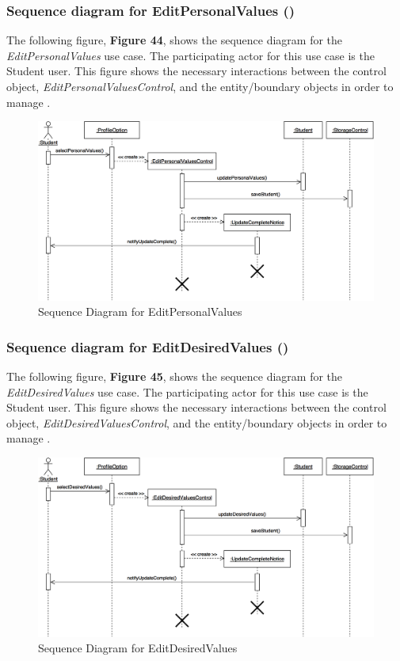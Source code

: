 \documentclass[12pt,letterpaper]{article}
\begin{document}
\subsubsection*{Sequence diagram for EditPersonalValues (\editpersonalvalues{})}

The following figure, {\bf Figure 44}, shows the sequence diagram for the {\it EditPersonalValues} use case. The participating actor for this use case is
the Student user. This figure shows the necessary interactions between the control object, {\it EditPersonalValuesControl}, and the
entity/boundary objects in order to manage \editpersonalvalues{}.

\begin{figure}[H]
	\centering{}
	\includegraphics[scale=0.3]{imgs/seq/edit-personal-values.png}
	\caption{Sequence Diagram for EditPersonalValues}
\end{figure}

\subsubsection*{Sequence diagram for EditDesiredValues (\editdesiredvalues{})}

The following figure, {\bf Figure 45}, shows the sequence diagram for the {\it EditDesiredValues} use case. The participating actor for this use case is
the Student user. This figure shows the necessary interactions between the control object, {\it EditDesiredValuesControl}, and the
entity/boundary objects in order to manage \editdesiredvalues{}.

\begin{figure}[H]
	\centering{}
	\includegraphics[scale=0.3]{imgs/seq/edit-desired-values.png}
	\caption{Sequence Diagram for EditDesiredValues}
\end{figure}
\end{document}
